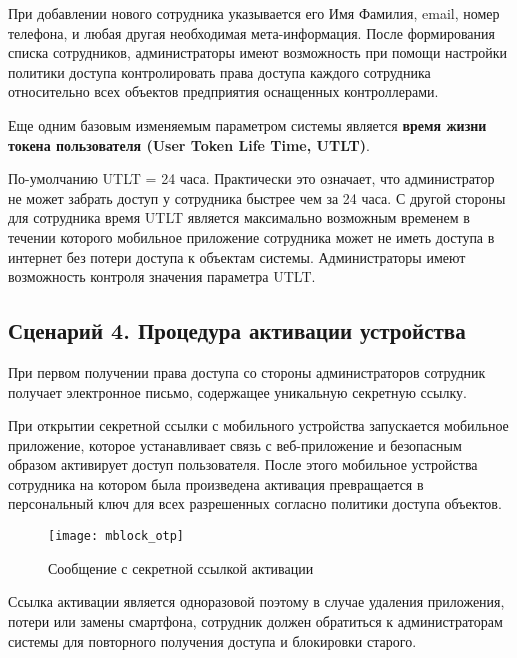 При добавлении нового сотрудника указывается его Имя Фамилия, email, номер телефона, и любая другая необходимая мета-информация. После формирования списка сотрудников, администраторы имеют возможность при помощи настройки политики доступа контролировать права доступа каждого сотрудника относительно всех объектов предприятия оснащенных контроллерами.

Еще одним базовым изменяемым параметром системы является \textbf{время жизни токена пользователя (User Token Life Time, UTLT)}. 

По-умолчанию UTLT = 24 часа. Практически это означает, что администратор не может забрать доступ у сотрудника быстрее чем за 24 часа. С другой стороны для сотрудника время UTLT является максимально возможным временем в течении которого мобильное приложение сотрудника может не иметь доступа в интернет без потери доступа к объектам системы. Администраторы имеют возможность контроля значения параметра UTLT.

\subsection{Сценарий 4. Процедура активации устройства} \label{subsect2_3_4}

При первом получении права доступа со стороны администраторов сотрудник получает  электронное письмо, содержащее уникальную секретную ссылку. 

При открытии секретной ссылки с мобильного устройства запускается мобильное приложение, которое устанавливает связь с веб-приложение и безопасным образом активирует доступ пользователя. После этого мобильное устройства сотрудника на котором была произведена активация превращается в персональный ключ для всех разрешенных согласно политики доступа объектов. 

\begin{figure}[ht] %
	\centering
	\texttt{[image: mblock\_otp]}\\ %
	\caption{Сообщение с секретной ссылкой активации}%
	\label{mblock_otp}%
\end{figure}

Ссылка активации является одноразовой поэтому в случае удаления приложения, потери или замены смартфона, сотрудник должен обратиться к администраторам системы для повторного получения доступа и блокировки старого.

